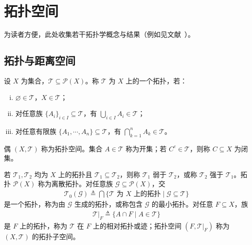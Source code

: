 \documentclass[../main.tex]{subfiles}
\begin{document}
\chapter{拓扑空间}\label{chapter:appA-拓扑空间}

为读者方便，此处收集若干拓扑学概念与结果（例如见文献~\cite{ref60}）。

\section{拓扑与距离空间}\label{section:appA-拓扑定义}

\begin{definition}[拓扑与拓扑空间]\label{definition:appA-拓扑}
设 $X$ 为集合，$\mathscr{T}\subseteq\mathcal{P}(X)$。称 $\mathscr{T}$ 为 $X$ 上的一个拓扑，若：
\begin{enumerate}[(i)]
\item $\varnothing \in\mathscr{T}$，$X\in\mathscr{T}$；
\item 对任意族 $\{A_i\}_{i\in I}\subseteq\mathscr{T}$，有 $\bigcup_{i\in I}A_i\in\mathscr{T}$；
\item 对任意有限族 $\{A_1,\cdots ,A_n\}\subseteq\mathscr{T}$，有 $\bigcap_{k=1}^n A_k\in\mathscr{T}$。
\end{enumerate}
偶 $(X,\mathscr{T})$ 称为拓扑空间。集合 $A\in\mathscr{T}$ 称为开集；若 $C^c\in\mathscr{T}$，则称 $C\subseteq X$ 为闭集。
\end{definition}

\begin{definition}\label{definition:appA-拓扑关系}
若 $\mathscr{T}_1,\mathscr{T}_2$ 均为 $X$ 上的拓扑且 $\mathscr{T}_1\subseteq\mathscr{T}_2$，则称 $\mathscr{T}_1$ 弱于 $\mathscr{T}_2$，或称 $\mathscr{T}_2$ 强于 $\mathscr{T}_1$。拓扑 $\mathcal{P}(X)$ 称为离散拓扑。对任意族 $\mathscr{G}\subseteq\mathcal{P}(X)$，交
\begin{align*}
\mathscr{T}_0(\mathscr{G})\triangleq \bigcap\{\mathscr{T}\text{ 为 }X\text{ 上的拓扑}\mid\mathscr{G}\subseteq\mathscr{T}\}
\end{align*}
是一个拓扑，称为由 $\mathscr{G}$ 生成的拓扑，或称包含 $\mathscr{G}$ 的最小拓扑。对任意 $F\subseteq X$，族
\begin{align*}
\mathscr{T}|_F\triangleq \{A\cap F\mid A\in\mathscr{T}\}
\end{align*}
是 $F$ 上的拓扑，称为 $\mathscr{T}$ 在 $F$ 上的相对拓扑或迹；拓扑空间 $(F,\mathscr{T}|_F)$ 称为 $(X,\mathscr{T})$ 的拓扑子空间。
\end{definition}
\end{document}
